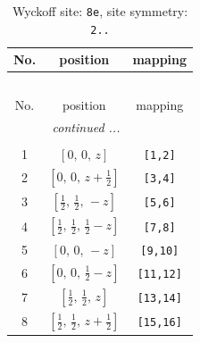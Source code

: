 \documentclass[fleqn,8pt]{jsarticle}
\begin{document}
\renewcommand{\arraystretch}{1.2}
\begin{longtable}{ccc}
\caption{Wyckoff site: {\tt 8e}, site symmetry: {\tt 2..}}
 \\
 \hline \hline
No. & position & mapping \\ \hline \endfirsthead

\multicolumn{2}{l}{\tablename\ \thetable{}} \\
 \hline \hline
No. & position & mapping \\ \hline \endhead

 \hline \hline
\multicolumn{2}{r}{\footnotesize\it continued ...} \\ \endfoot

 \hline \hline
\multicolumn{2}{r}{} \\ \endlastfoot

1 & $\left[ 0,\, 0,\, z \right]$ & {\tt [1,2]} \\ \hline
2 & $\left[ 0,\, 0,\, z + \frac{1}{2} \right]$ & {\tt [3,4]} \\ \hline
3 & $\left[ \frac{1}{2},\, \frac{1}{2},\, - z \right]$ & {\tt [5,6]} \\ \hline
4 & $\left[ \frac{1}{2},\, \frac{1}{2},\, \frac{1}{2} - z \right]$ & {\tt [7,8]} \\ \hline
5 & $\left[ 0,\, 0,\, - z \right]$ & {\tt [9,10]} \\ \hline
6 & $\left[ 0,\, 0,\, \frac{1}{2} - z \right]$ & {\tt [11,12]} \\ \hline
7 & $\left[ \frac{1}{2},\, \frac{1}{2},\, z \right]$ & {\tt [13,14]} \\ \hline
8 & $\left[ \frac{1}{2},\, \frac{1}{2},\, z + \frac{1}{2} \right]$ & {\tt [15,16]} \\
\end{longtable}
\renewcommand{\arraystretch}{1.2}
\end{document}
